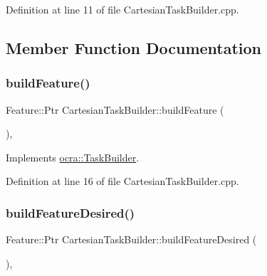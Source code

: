 Definition at line 11 of file Cartesian\+Task\+Builder.\+cpp.



\subsection{Member Function Documentation}
\hypertarget{classocra_1_1CartesianTaskBuilder_a58c8e4a299db03180c058eefcd711052}{}\label{classocra_1_1CartesianTaskBuilder_a58c8e4a299db03180c058eefcd711052} 
\subsubsection{\texorpdfstring{build\+Feature()}{buildFeature()}}
{\footnotesize\ttfamily Feature\+::\+Ptr Cartesian\+Task\+Builder\+::build\+Feature (\begin{DoxyParamCaption}{ }\end{DoxyParamCaption})\hspace{0.3cm}{\ttfamily [protected]}, {\ttfamily [virtual]}}



Implements \hyperlink{classocra_1_1TaskBuilder_a58c0dc416a9607a344a080248ee26ac2}{ocra\+::\+Task\+Builder}.



Definition at line 16 of file Cartesian\+Task\+Builder.\+cpp.

\hypertarget{classocra_1_1CartesianTaskBuilder_a308b204435c4063991d8101c0a8c512c}{}\label{classocra_1_1CartesianTaskBuilder_a308b204435c4063991d8101c0a8c512c} 
\subsubsection{\texorpdfstring{build\+Feature\+Desired()}{buildFeatureDesired()}}
{\footnotesize\ttfamily Feature\+::\+Ptr Cartesian\+Task\+Builder\+::build\+Feature\+Desired (\begin{DoxyParamCaption}{ }\end{DoxyParamCaption})\hspace{0.3cm}{\ttfamily [protected]}, {\ttfamily [virtual]}}




